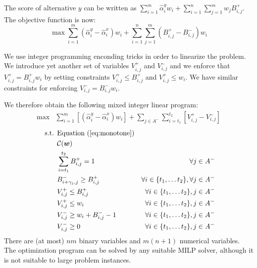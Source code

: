 
The score of alternative $y$ can be written as $\sum_{i = 1}^{m} \hat{\alpha}_{i}^{y}  w_{i} + \sum_{i=1}^{n} \sum_{j=1}^{m} w_{j} B_{i,j}^{+}$.
The objective function is now:
 \[ \max \sum_{i = 1}^{m} (\hat{\alpha}_{i}^{y} - \hat{\alpha}_{i}^{x}) w_{i} +  \sum_{i=1}^{n} \sum_{j=1}^{m} (B_{i,j}^{+} - B_{i,j}^{-})  w_i \]

We use integer programming enconding tricks in order to linearize the problem.
We introduce yet another set of variables  $V_{i,j}^{+} $  and $V_{i,j}^{-}$ %
and we enforce that $V_{i,j}^{+} = B^{+}_{i,j} w_i$ by setting constraints $V_{i,j}^{+} \leq B^{+}_{i,j}$ and $V_{i,j}^{+}  \leq w_i$.
We have similar constraints for enforcing $V_{i,j}^{-} = B^{-}_{i,j} w_i$.

We therefore obtain the following mixed integer linear program:
\begin{align}
\max & \sum_{i=1}^m  [(\hat{\alpha}_{i}^{y} - \hat{\alpha}_{i}^{x}) w_{i}] +
  \sum_{j \in A^{-}} \sum_{i=t_{1}}^{t_{2}}  [V_{i,j}^{+} - V_{i,j}^{-}]
\end{align}
\begin{align}
\text{ s.t. } &  \text{Equation } (\ref{eq:monotone}) & \\
&  \mathcal{C}(\bm{w}) &  \\
& \sum_{i=t_{1}}^{t_{2}} B_{i,j}^{+} = 1 & \forall j \in A^{-} \\
& B_{i+\gamma_{j},j}^{-} \geq B_{i,j}^{+} & \forall i \in \{ t_{1}, \ldots t_{2}\}, \forall j \in A^{-} \\
& V_{i,j}^{+} \leq B_{i,j}^{+}  & \forall i \in \{ t_{1}, \ldots t_{2}\}, j \in A^{-} \\
& V_{i,j}^{+} \leq w_i & \forall i \in \{ t_{1}, \ldots t_{2}\}, j \in A^{-} \\
& V_{i,j}^{-} \geq w_{i} + B_{i,j}^{-} - 1 & \forall i \in \{ t_{1}, \ldots t_{2}\}, j \in A^{-}\\
& V_{i,j}^{-} \geq 0 & \forall i \in \{ t_{1}, \ldots t_{2}\}, j \in A^{-}
\end{align} 
There are (at most) $nm$ binary variables and $m(n+1)$ numerical variables.
The optimization program can be solved by any suitable MILP solver, although it is not suitable to large problem instances.

